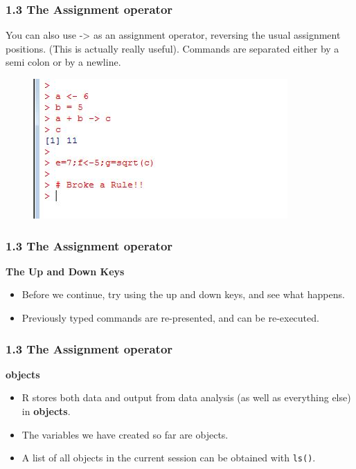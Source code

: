 \documentclass{beamer}
\begin{document}
 	\begin{frame}
 		\frametitle{1.3 The Assignment operator}
 		
 		You can also use -> as an assignment operator, reversing the
 		usual assignment positions. (This is actually really useful). Commands are separated either by
 		a semi colon or by a newline.
 		\begin{figure}
 			\centering
 			\includegraphics[width=0.7\linewidth]{images/assignment}
 			\caption{}
 			\label{fig:assignment}
 		\end{figure}
 		
 	\end{frame}

 \begin{frame}
 	\frametitle{1.3 The Assignment operator}
 	\textbf{The Up and Down Keys}
 	\begin{itemize}
 		\item Before we continue, try using the up and down keys, and see what happens. 
 		\item Previously
 		typed commands are re-presented, and can be re-executed.
 	\end{itemize}
 	
 \end{frame}
 \begin{frame}
 	\frametitle{1.3 The Assignment operator }
 	\textbf{objects}
 	\begin{itemize}
 		\item R stores both data and output from data analysis (as well as everything else) in \textbf{objects}.
 		\item The variables we have created so far are objects. 
 		\item A list of all objects in the current session can
 		be obtained with \texttt{ls()}.
 	\end{itemize}
 \end{frame}
 
\end{document}
